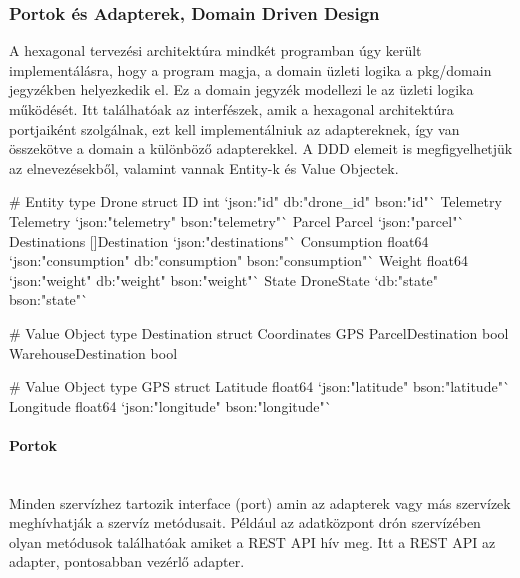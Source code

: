 \subsubsection{Portok és Adapterek, Domain Driven Design}
A hexagonal tervezési architektúra mindkét programban úgy került implementálásra, hogy a program magja, a domain üzleti logika a pkg/domain jegyzékben helyezkedik el.
Ez a domain jegyzék modellezi le az üzleti logika működését.
Itt találhatóak az interfészek, amik a hexagonal architektúra portjaiként szolgálnak, ezt kell implementálniuk az adaptereknek, így van összekötve a domain a különböző adapterekkel.
A DDD elemeit is megfigyelhetjük az elnevezésekből, valamint vannak Entity-k és Value Objectek.
\begin{python}
    # Entity
    type Drone struct {
        ID           int           `json:"id" db:"drone_id" bson:"id"`
        Telemetry    Telemetry     `json:"telemetry" bson:"telemetry"`
        Parcel       Parcel        `json:"parcel"`
        Destinations []Destination `json:"destinations"`
        Consumption  float64       `json:"consumption" db:"consumption" bson:"consumption"`
        Weight       float64       `json:"weight" db:"weight" bson:"weight"`
        State        DroneState    `db:"state" bson:"state"`
    }

    # Value Object
    type Destination struct {
        Coordinates          GPS
        ParcelDestination    bool
        WarehouseDestination bool
    }

    # Value Object
    type GPS struct {
        Latitude  float64 `json:"latitude" bson:"latitude"`
        Longitude float64 `json:"longitude" bson:"longitude"`
    }
\end{python}

\paragraph{Portok}\mbox{} \\
Minden szervízhez tartozik interface (port) amin az adapterek vagy más szervízek meghívhatják a szervíz metódusait.
Például az adatközpont drón szervízében olyan metódusok találhatóak amiket a REST API hív meg.
Itt a REST API az adapter, pontosabban vezérlő adapter.

